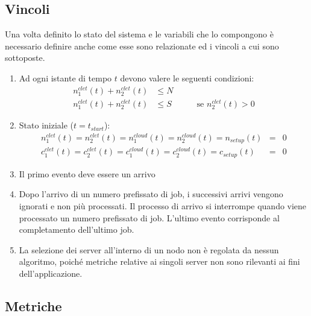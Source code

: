 \subsection{Vincoli}
Una volta definito lo stato del sistema e le variabili che lo compongono è
necessario definire anche come esse sono relazionate ed i vincoli a cui sono
sottoposte.
\begin{enumerate}
\item Ad ogni istante di tempo $t$ devono valere le seguenti condizioni:
\begin{eqnarray*}
n_1^{clet}(t) + n_2^{clet}(t) & \leq N & \\
n_1^{clet}(t) + n_2^{clet}(t) & \leq S & \qquad \textrm{se } n_2^{clet}(t) > 0
\end{eqnarray*}
\item Stato iniziale ($t=t_{start}$):
\begin{eqnarray*}
n_1^{clet}(t) = n_2^{clet}(t) = n_1^{cloud}(t) = n_2^{cloud}(t) = n_{setup}(t) &=& 0 
\\
c_1^{clet}(t) = c_2^{clet}(t) = c_1^{cloud}(t) = c_2^{cloud}(t) = c_{setup}(t) &=& 0
\end{eqnarray*}
\item Il primo evento deve essere un arrivo
\item Dopo l’arrivo di un numero prefissato di job, i successivi arrivi vengono
ignorati e non più processati.  Il processo di arrivo si interrompe quando viene
processato un numero prefissato di job.  L’ultimo evento corrisponde al
completamento dell’ultimo job.
\item La selezione dei server all’interno di un nodo non è regolata da nessun
algoritmo, poiché metriche relative ai singoli server non sono rilevanti ai fini
dell’applicazione.  
\end{enumerate}
%
%
\subsection{Metriche}
